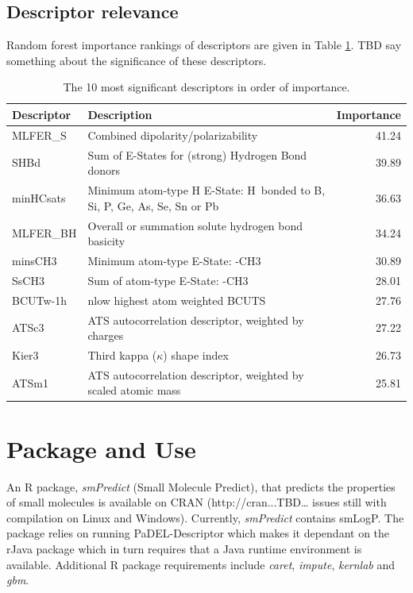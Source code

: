 \documentclass[10pt]{bmc_article}
\newenvironment{bmcformat}{\begin{raggedright}\baselineskip20pt\sloppy\setboolean{publ}{false}}{\end{raggedright}\baselineskip20pt\sloppy}
\begin{document}
\begin{bmcformat}
\subsection*{Descriptor relevance}
Random forest importance rankings of descriptors are given in Table \ref{tab:importance}. TBD say something about the significance of these descriptors.

\begin{table}[htbp]
  \centering
  \caption{The 10 most significant descriptors in order of importance.}
    \begin{tabular}{llr}
    \toprule
    Descriptor & Description & Importance \\
    \midrule
    MLFER\_S & Combined dipolarity/polarizability & 41.24 \\
    SHBd  & Sum of E-States for (strong) Hydrogen Bond donors & 39.89 \\
    minHCsats & Minimum atom-type H E-State: H bonded to B, Si, P, Ge, As, Se, Sn or Pb & 36.63\\
    MLFER\_BH & Overall or summation solute hydrogen bond basicity & 34.24 \\
    minsCH3 & Minimum atom-type E-State: -CH3 & 30.89 \\
    SsCH3 & Sum of atom-type E-State: -CH3 & 28.01 \\
    BCUTw-1h & nlow highest atom weighted BCUTS  & 27.76 \\
    ATSc3 & ATS autocorrelation descriptor, weighted by charges & 27.22 \\
    Kier3 & Third kappa ($\kappa$) shape index  & 26.73 \\
    ATSm1 & ATS autocorrelation descriptor, weighted by scaled atomic mass & 25.81 \\
    \bottomrule
    \end{tabular}%
  \label{tab:importance}%
\end{table}%

\section*{Package and Use}

An R package, \textit{smPredict} (Small Molecule Predict), that predicts the properties of small molecules is available on CRAN (http://cran...TBD… issues still with compilation on Linux and Windows). Currently, \textit{smPredict} contains smLogP. The package relies on running PaDEL-Descriptor which makes it dependant on the rJava package \cite{rJava} which in turn requires that a Java runtime environment is available. Additional R package requirements include \textit{caret}, \textit{impute}, \textit{kernlab} and \textit{gbm}.


\end{bmcformat}
\end{document}
